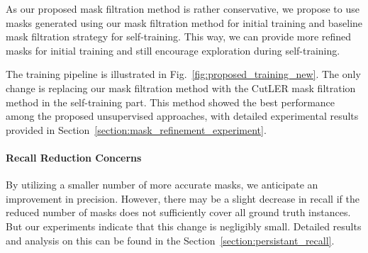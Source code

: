 As our proposed mask filtration method is rather conservative, we propose to use masks generated using our mask filtration method for initial training and baseline mask filtration strategy for self-training. This way, we can provide more refined masks for initial training and still encourage exploration during self-training. 

The training pipeline is illustrated in Fig.~\ref{fig:proposed_training_new}. The only change is replacing our mask filtration method with the CutLER mask filtration method in the self-training part. This method showed the best performance among the proposed unsupervised approaches, with detailed experimental results provided in Section~\ref{section:mask_refinement_experiment}.

 
\paragraph{Recall Reduction Concerns}
By utilizing a smaller number of more accurate masks, we anticipate an improvement in precision. However, there may be a slight decrease in recall if the reduced number of masks does not sufficiently cover all ground truth instances. But our experiments indicate that this change is negligibly small. Detailed results and analysis on this can be found in the Section~\ref{section:persistant_recall}.





